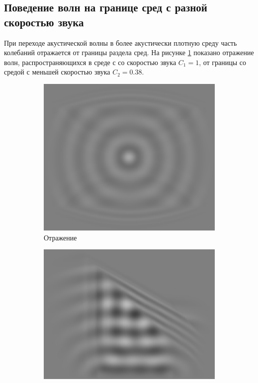 \documentclass[a4paper, fontsize=14pt]{article}
\begin{document}
\subsection{Поведение волн на границе сред с разной скоростью звука}
При переходе акустической волны в более акустически плотную среду часть колебаний отражается от
границы раздела сред. На рисунке \ref{wrefl} показано отражение волн, распространяющихся в среде с
со скоростью звука $C_1 = 1$, от границы со средой с меньшей скоростью звука $C_2 = 0.38$.
\begin{figure}[h]
	\centering
	\begin{subfigure}{0.3\textwidth}
		\centering
		\includegraphics[width=\textwidth]{refl.eps}
		\caption{Отражение}
		\label{wrefl}
	\end{subfigure}
	\begin{subfigure}{0.3\textwidth}
		\centering
		\includegraphics[width=\textwidth]{refr.eps}

\end{subfigure}
\end{figure}
\end{document}

